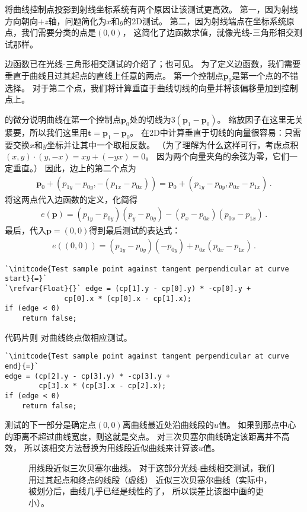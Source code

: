 将曲线控制点投影到射线坐标系统有两个原因让该测试更高效。
第一，因为射线方向朝向$+z$轴，问题简化为$x$和$y$的2D测试。
第二，因为射线端点在坐标系统原点，我们需要分类的点是$(0,0)$，
这简化了边函数求值，就像光线-三角形相交测试那样。

边函数已在光线-三角形相交测试的介绍了；也可见。
为了定义边函数，我们需要垂直于曲线且过其起点的直线上任意的两点。
第一个控制点$\bm p_0$是第一个点的不错选择。
对于第二个点，我们将计算垂直于曲线切线的向量并将该偏移量加到控制点上。

的微分说明曲线在第一个控制点$\bm p_0$处的切线为$3(\bm p_1-\bm p_0)$。
缩放因子在这里无关紧要，所以我们这里用$\bm t=\bm p_1-\bm p_0$。
在2D中计算垂直于切线的向量很容易：只需要交换$x$和$y$坐标并让其中一个取相反数。
（为了理解为什么这样可行，考虑点积$(x,y)\cdot(y,-x)=xy+(-yx)=0$。
因为两个向量夹角的余弦为零，它们一定垂直。）
因此，边上的第二个点为
\begin{align*}
    \bm p_0+(p_{1y}-p_{0y},-(p_{1x}-p_{0x}))=\bm p_0+(p_{1y}-p_{0y},p_{0x}-p_{1x})\, .
\end{align*}
将这两点代入边函数的定义，化简得
\begin{align*}
    e(\bm p)=(p_{1y}-p_{0y})(p_y-p_{0y})-(p_x-p_{0x})(p_{0x}-p_{1x})\, .
\end{align*}
最后，代入$\bm p=(0,0)$得到最后测试的表达式：
\begin{align*}
    e((0,0))=(p_{1y}-p_{0y})(-p_{0y})+p_{0x}(p_{0x}-p_{1x})\, .
\end{align*}
\begin{lstlisting}
`\initcode{Test sample point against tangent perpendicular at curve start}{=}`
`\refvar{Float}{}` edge = (cp[1].y - cp[0].y) * -cp[0].y +
              cp[0].x * (cp[0].x - cp[1].x);
if (edge < 0)
    return false;
\end{lstlisting}

代码片则
对曲线终点做相应测试。
\begin{lstlisting}
`\initcode{Test sample point against tangent perpendicular at curve end}{=}`
edge = (cp[2].y - cp[3].y) * -cp[3].y +
        cp[3].x * (cp[3].x - cp[2].x);
if (edge < 0)
    return false;
\end{lstlisting}

测试的下一部分是确定点$(0,0)$离曲线最近处沿曲线段的$u$值。
如果到那点中心的距离不超过曲线宽度，则这就是交点。
对三次贝塞尔曲线确定该距离并不高效，
所以该相交方法替换为用线段近似曲线来计算该$u$值。
\begin{figure}[htbp]
    \centering
    \caption{用线段近似三次贝塞尔曲线。
        对于这部分光线-曲线相交测试，我们用过其起点和终点的线段（虚线）
        近似三次贝塞尔曲线（实际中，被划分后，曲线几乎已经是线性的了，
        所以误差比该图中画的更小）。}
    \label{fig:3.22}
\end{figure}

